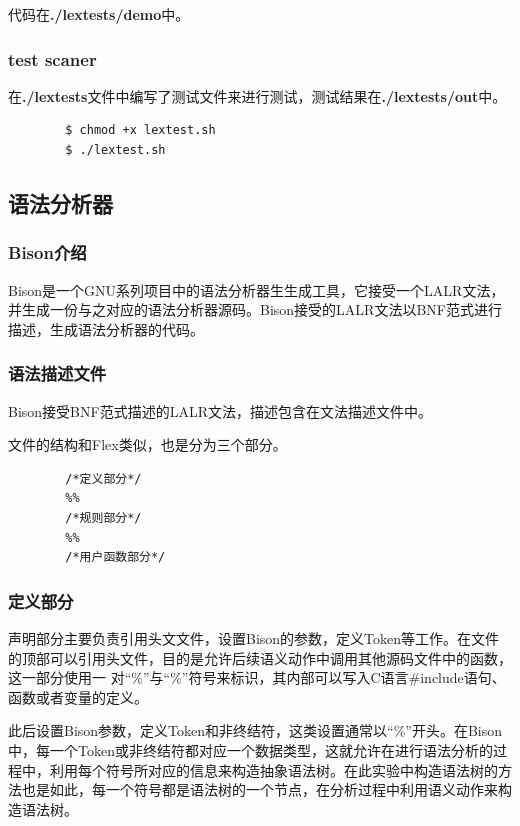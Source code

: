 \documentclass{article}
\begin{document}
	代码在\textbf{./lextests/demo}中。

	\subsubsection{test scaner}
	在\textbf{./lextests}文件中编写了测试文件来进行测试，测试结果在\textbf{./lextests/out}中。
	
	\begin{commandline}
		\begin{verbatim}
		$ chmod +x lextest.sh
		$ ./lextest.sh
		\end{verbatim}
	\end{commandline}
	
\subsection{语法分析器}

	\subsubsection{Bison介绍}
	Bison是一个GNU系列项⽬中的语法分析器⽣生成工具，它接受⼀个LALR⽂法，并生成一份与之对应的语法分析器源码。Bison接受的LALR文法以BNF范式进行描述，生成语法分析器的代码。
	
	\subsubsection{语法描述文件}
	Bison接受BNF范式描述的LALR文法，描述包含在文法描述文件中。
	
	文件的结构和Flex类似，也是分为三个部分。
	
	\begin{small}
		\begin{lstlisting}
		/*定义部分*/
		%%
		/*规则部分*/
		%%
		/*用户函数部分*/
		\end{lstlisting}
	\end{small}

	\subsubsection{定义部分}
	声明部分主要负责引⽤头⽂文件，设置Bison的参数，定义Token等工作。在文件的顶部可以引用头⽂件，⽬的是允许后续语义动作中调⽤其他源码⽂件中的函数，这一部分使⽤⼀ 对“\%{”与“\%}”符号来标识，其内部可以写入C语言\#include语句、函数或者变量的定义。
	
	此后设置Bison参数，定义Token和非终结符，这类设置通常以“\%”开头。在Bison中，每一个Token或⾮终结符都对应⼀个数据类型，这就允许在进⾏语法分析的过程中，利用每个符号所对应的信息来构造抽象语法树。在此实验中构造语法树的方法也是如此，每⼀个符号都是语法树的⼀个节点，在分析过程中利⽤语义动作来构造语法树。
	
\end{document}
